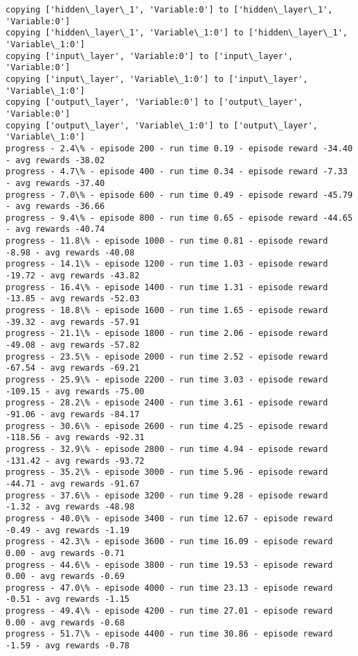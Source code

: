 \documentclass[11pt]{article}
\begin{document}
    \begin{Verbatim}[commandchars=\\\{\}]
copying ['hidden\_layer\_1', 'Variable:0'] to ['hidden\_layer\_1', 'Variable:0']
copying ['hidden\_layer\_1', 'Variable\_1:0'] to ['hidden\_layer\_1', 'Variable\_1:0']
copying ['input\_layer', 'Variable:0'] to ['input\_layer', 'Variable:0']
copying ['input\_layer', 'Variable\_1:0'] to ['input\_layer', 'Variable\_1:0']
copying ['output\_layer', 'Variable:0'] to ['output\_layer', 'Variable:0']
copying ['output\_layer', 'Variable\_1:0'] to ['output\_layer', 'Variable\_1:0']
progress - 2.4\% - episode 200 - run time 0.19 - episode reward -34.40 - avg rewards -38.02
progress - 4.7\% - episode 400 - run time 0.34 - episode reward -7.33 - avg rewards -37.40
progress - 7.0\% - episode 600 - run time 0.49 - episode reward -45.79 - avg rewards -36.66
progress - 9.4\% - episode 800 - run time 0.65 - episode reward -44.65 - avg rewards -40.74
progress - 11.8\% - episode 1000 - run time 0.81 - episode reward -8.98 - avg rewards -40.08
progress - 14.1\% - episode 1200 - run time 1.03 - episode reward -19.72 - avg rewards -43.82
progress - 16.4\% - episode 1400 - run time 1.31 - episode reward -13.85 - avg rewards -52.03
progress - 18.8\% - episode 1600 - run time 1.65 - episode reward -39.32 - avg rewards -57.91
progress - 21.1\% - episode 1800 - run time 2.06 - episode reward -49.08 - avg rewards -57.82
progress - 23.5\% - episode 2000 - run time 2.52 - episode reward -67.54 - avg rewards -69.21
progress - 25.9\% - episode 2200 - run time 3.03 - episode reward -109.15 - avg rewards -75.00
progress - 28.2\% - episode 2400 - run time 3.61 - episode reward -91.06 - avg rewards -84.17
progress - 30.6\% - episode 2600 - run time 4.25 - episode reward -118.56 - avg rewards -92.31
progress - 32.9\% - episode 2800 - run time 4.94 - episode reward -131.42 - avg rewards -93.72
progress - 35.2\% - episode 3000 - run time 5.96 - episode reward -44.71 - avg rewards -91.67
progress - 37.6\% - episode 3200 - run time 9.28 - episode reward -1.32 - avg rewards -48.98
progress - 40.0\% - episode 3400 - run time 12.67 - episode reward -0.49 - avg rewards -1.19
progress - 42.3\% - episode 3600 - run time 16.09 - episode reward 0.00 - avg rewards -0.71
progress - 44.6\% - episode 3800 - run time 19.53 - episode reward 0.00 - avg rewards -0.69
progress - 47.0\% - episode 4000 - run time 23.13 - episode reward -0.51 - avg rewards -1.15
progress - 49.4\% - episode 4200 - run time 27.01 - episode reward 0.00 - avg rewards -0.68
progress - 51.7\% - episode 4400 - run time 30.86 - episode reward -1.59 - avg rewards -0.78

\end{Verbatim}
\end{document}
